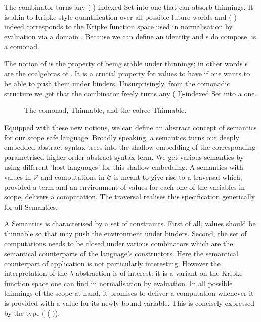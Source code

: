 The  combinator turns any ( )-indexed Set into one that can absorb
thinnings. It is akin to Kripke-style quantification over all possible future
worlds and  (  ) indeed corresponds to the Kripke
function space used in normalisation by evaluation via a domain .
Because we can define an identity  and s do
compose,  is a comonad.

The notion of  is the property of being stable under thinnings;
in other words s are the coalgebras of .
It is a crucial property for values to have if one wants to be able to push
them under binders. Unsurprisingly, from the comonadic structure we get that
the  combinator freely turns any ( I)-indexed Set into a
 one.

\begin{figure}[h]
\begin{minipage}{0.45\textwidth}
\end{minipage}\hspace{2em}
\begin{minipage}{0.45\textwidth}
\end{minipage}
\caption{The  comonad, Thinnable, and the cofree Thinnable.}
\end{figure}

Equipped with these new notions, we can define an abstract
concept of semantics for our scope safe language. Broadly
speaking, a semantics turns our deeply embedded abstract
syntax trees into the shallow embedding of the corresponding
parametrised higher order abstract syntax term. We get various
semantics by using different 'host languages' for this shallow
embedding. A semantics with values in $\mathcal{V}$ and
computations in $\mathcal{C}$ is meant to give rise to a
traversal which, provided a term and an environment of values
for each one of the variables in scope, delivers a computation.
The traversal  realises this specification generically
for all Semantics.

A Semantics is characterised by a set of constraints. First of all,
values should be thinnable so that  may push the environment
under binders. Second, the set of computations needs to be closed
under various combinators which are the semantical counterparts of
the language's constructors. Here the semantical counterpart of
application is not particularly interesting. However the interpretation
of the $\lambda$-abstraction is of interest: it is a variant on
the Kripke function space one can find in normalisation by evaluation.
In all possible thinnings of the scope at hand, it promises to deliver
a computation whenever it is provided with a value for its newly
bound variable. This is concisely expressed by the type
( (  )).

